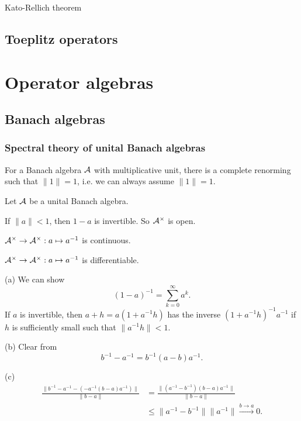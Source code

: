 \documentclass{../../large}
\begin{document}
Kato-Rellich theorem




\chapter{Toeplitz operators}








\part{Operator algebras}
\chapter{Banach algebras}

\section{Spectral theory of unital Banach algebras}

\begin{prb}
For a Banach algebra $\mathcal{A}$ with multiplicative unit, there is a complete renorming such that $\|1\|=1$, i.e. we can always assume $\|1\|=1$.

Let $\mathcal{A}$ be a unital Banach algebra.
\begin{parts}
\item If $\|a\|<1$, then $1-a$ is invertible. So $\mathcal{A}^\times$ is open.
\item $\mathcal{A}^\times\to\mathcal{A}^\times:a\mapsto a^{-1}$ is continuous.
\item $\mathcal{A}^\times\to\mathcal{A}^\times:a\mapsto a^{-1}$ is differentiable.
\end{parts}
\end{prb}
\begin{pf}
(a)
We can show
\[(1-a)^{-1}=\sum_{k=0}^\infty a^k.\]
If $a$ is invertible, then $a+h=a(1+a^{-1}h)$ has the inverse $(1+a^{-1}h)^{-1}a^{-1}$ if $h$ is sufficiently small such that $\|a^{-1}h\|<1$.

(b)
Clear from
\[b^{-1}-a^{-1}=b^{-1}(a-b)a^{-1}.\]

(c)
\begin{align*}
\frac{\|b^{-1}-a^{-1}-(-a^{-1}(b-a)a^{-1})\|}{\|b-a\|}
&=\frac{\|(a^{-1}-b^{-1})(b-a)a^{-1}\|}{\|b-a\|}\\
&\le\|a^{-1}-b^{-1}\|\|a^{-1}\|\xrightarrow{b\to a}0.
\end{align*}
\end{pf}
\end{document}
